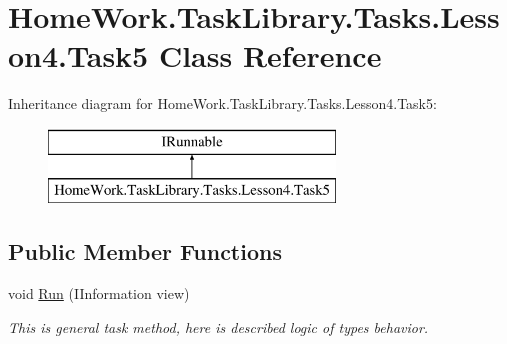 \hypertarget{class_home_work_1_1_task_library_1_1_tasks_1_1_lesson4_1_1_task5}{}\section{Home\+Work.\+Task\+Library.\+Tasks.\+Lesson4.\+Task5 Class Reference}
\label{class_home_work_1_1_task_library_1_1_tasks_1_1_lesson4_1_1_task5}
Inheritance diagram for Home\+Work.\+Task\+Library.\+Tasks.\+Lesson4.\+Task5\+:\begin{figure}[H]
\begin{center}
\leavevmode
\includegraphics[height=2.000000cm]{class_home_work_1_1_task_library_1_1_tasks_1_1_lesson4_1_1_task5}
\end{center}
\end{figure}
\subsection*{Public Member Functions}
\begin{DoxyCompactItemize}
\item 
void \mbox{\hyperlink{class_home_work_1_1_task_library_1_1_tasks_1_1_lesson4_1_1_task5_a63d54a5d4b54aa37ce77d77dbd8c0062}{Run}} (I\+Information view)
\begin{DoxyCompactList}\small\item\em This is general task method, here is described logic of types behavior. \end{DoxyCompactList}\end{DoxyCompactItemize}
